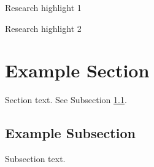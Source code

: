 \documentclass[preprint,12pt]{elsarticle}
\begin{document}
\begin{frontmatter}
\begin{graphicalabstract}
\end{graphicalabstract}

\begin{highlights}
\item Research highlight 1
\item Research highlight 2
\end{highlights}

\begin{keyword}



\end{keyword}

\end{frontmatter}



\section{Example Section}
\label{sec1}

Section text. See Subsection \ref{subsec1}.

\subsection{Example Subsection}
\label{subsec1}

Subsection text.

\end{document}
